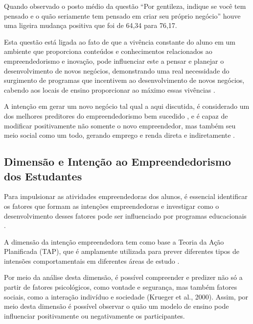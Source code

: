 Quando observado o posto médio da questão “Por gentileza, indique se você tem pensado e o quão seriamente tem pensado em criar seu próprio negócio” houve uma ligeira mudança positiva que foi de 64,34 para 76,17. 

Esta questão está ligada ao fato de que a vivência constante do aluno em um ambiente que proporciona conteúdos e conhecimentos relacionados ao empreendedorismo e inovação, pode influenciar este a pensar e planejar o desenvolvimento de novos negócios, demonstrando uma real necessidade do surgimento de programas que incentivem ao desenvolvimento de novos negócios, cabendo aos locais de ensino proporcionar ao máximo essas vivências \cite{damanpour_phases_2006}.

A intenção em gerar um novo negócio tal qual a aqui discutida, é considerado um dos melhores preditores do empreendedorismo bem sucedido \cite{ajzen_attitudes_1987,garcia-rodriguez_entrepreneurial_2017,krueger_potencial_2018}, e é capaz de modificar positivamente não somente o novo empreendedor, mas também seu meio social como um todo, gerando emprego e renda direta e indiretamente \cite{gonzaga_infraestrutura_2017}.



\subsection{Dimensão e Intenção ao Empreendedorismo dos Estudantes}

Para impulsionar as atividades empreendedoras dos alunos, é essencial identificar os fatores que formam as intenções empreendedoras e investigar como o desenvolvimento desses fatores pode ser influenciado por programas educacionais \cite{gubik_entrepreneurial_2019}. 


A dimensão da intenção empreendedora tem como base a Teoria da Ação Planificada (TAP), que é amplamente utilizada para prever diferentes tipos de intensões comportamentais em diferentes áreas de estudo \cite{oliveira_educacao_2016,ros_psicologisocial_2001}. 

Por meio da análise desta dimensão, é possível  compreender e predizer não só a partir de fatores psicológicos, como vontade e segurança, mas também fatores sociais, como a interação indivíduo e sociedade (Krueger et al., 2000). Assim, por meio desta dimensão é possível observar o quão um modelo de ensino pode influenciar positivamente ou negativamente os participantes.

